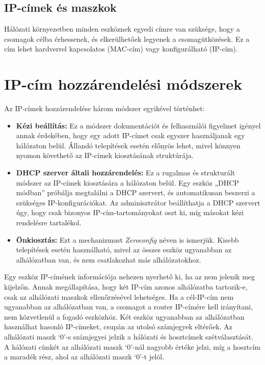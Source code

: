 \subsection{IP-címek és maszkok}
Hálózati környezetben minden eszköznek egyedi címre van szüksége, hogy a
csomagok célba érhessenek, és elkerülhetőek legyenek a csomagütközések.
Ez a cím lehet hardverrel kapcsolatos (MAC-cím) vagy konfigurálható (IP-cím).

\section{IP-cím hozzárendelési módszerek}
Az IP-címek hozzárendelése három módszer egyikével történhet:

\begin{itemize}
    \item \textbf{Kézi beállítás:}
    Ez a módszer dokumentációt és felhasználói figyelmet igényel annak érdekében,
    hogy egy adott IP-címet csak egyszer használjanak egy hálózaton belül.
    Állandó telepítések esetén előnyös lehet, mivel könnyen nyomon követhető
    az IP-címek kiosztásának struktúrája.

    \item \textbf{DHCP szerver általi hozzárendelés:}
    Ez a rugalmas és strukturált módszer az IP-címek kiosztására a hálózaton belül.
    Egy eszköz „DHCP módban” próbálja megtalálni a DHCP szervert, és automatikusan
    beszerzi a szükséges IP-konfigurációkat. Az adminisztrátor beállíthatja a DHCP
    szervert úgy, hogy csak bizonyos IP-cím-tartományokat oszt ki, míg másokat
    kézi rendelésre tartalékol.

    \item \textbf{Önkiosztás:}
    Ezt a mechanizmust \textit{Zeroconfig} néven is ismerjük. Kisebb telepítések
    esetén használható, mivel az összes eszköz ugyanabban az alhálózatban van,
    és nem csatlakozhat más alhálózatokhoz.
\end{itemize}

Egy eszköz IP-címének információja nehezen nyerhető ki, ha az nem jelenik meg
kijelzőn. Annak megállapítása, hogy két IP-cím azonos alhálózatba tartozik-e,
csak az alhálózati maszkok ellenőrzésével lehetséges. Ha a cél-IP-cím nem
ugyanabban az alhálózatban van, a csomagot a router IP-címére kell irányítani,
nem közvetlenül a fogadó eszközhöz. Két eszköz ugyanabban az alhálózatban
használhat hasonló IP-címeket, csupán az utolsó számjegyek eltérőek.
Az alhálózati maszk `0'-s számjegyei jelzik a hálózati és hosztcímek
szétválasztását. A hálózati címkét az alhálózati maszk `0'-nál nagyobb
értéke jelzi, míg a hosztcím a maradék rész, ahol az alhálózati maszk `0'-t
jelöl.

